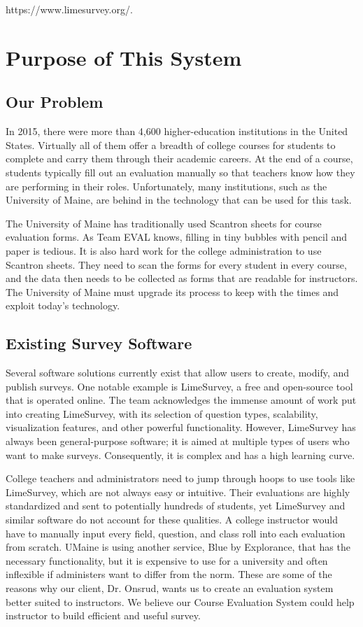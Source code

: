 \documentclass{article}
\begin{document}
https://www.limesurvey.org/.

\section{Purpose of This System}

\subsection{Our Problem}

In 2015, there were more than 4,600 higher-education institutions in the United States. Virtually all of them offer a breadth of college courses for students to complete and carry them through their academic careers. At the end of a course, students typically fill out an evaluation manually so that teachers know how they are performing in their roles. Unfortunately, many institutions, such as the University of Maine, are behind in the technology that can be used for this task.

The University of Maine has traditionally used Scantron sheets for course evaluation forms. As Team EVAL knows, filling in tiny bubbles with pencil and paper is tedious. It is also hard work for the college administration to use Scantron sheets. They need to scan the forms for every student in every course, and the data then needs to be collected as forms that are readable for instructors. The University of Maine must upgrade its process to keep with the times and exploit today's technology.

\subsection{Existing Survey Software}

Several software solutions currently exist that allow users to create, modify, and publish surveys. One notable example is LimeSurvey, a free and open-source tool that is operated online. The team acknowledges the immense amount of work put into creating LimeSurvey, with its selection of question types, scalability, visualization features, and other powerful functionality. However, LimeSurvey has always been general-purpose software; it is aimed at multiple types of users who want to make surveys. Consequently, it is complex and has a high learning curve.

College teachers and administrators need to jump through hoops to use tools like LimeSurvey, which are not always easy or intuitive. Their evaluations are highly standardized and sent to potentially hundreds of students, yet LimeSurvey and similar software do not account for these qualities. A college instructor would have to manually input every field, question, and class roll into each evaluation from scratch. UMaine is using another service, Blue by Explorance, that has the necessary functionality, but it is expensive to use for a university and often inflexible if administers want to differ from the norm. These are some of the reasons why our client, Dr. Onsrud, wants us to create an evaluation system better suited to instructors. We believe our Course Evaluation System could help instructor to build efficient and useful survey. 
\end{document}
